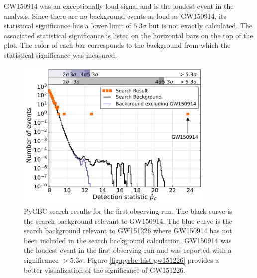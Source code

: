 GW150914 
was an exceptionally loud signal and is the loudest event in the 
analysis. Since there are no background events as loud as GW150914, 
its statistical significance has a lower limit of $5.3\sigma$ 
but is not exactly calculated. The associated statistical significance 
is listed on the horizontal bars on the top of the plot. The color 
of each bar corresponds to the background from which the statistical 
significance was measured.  

\begin{figure}[ht!]%
\includegraphics[width=0.85\textwidth]{figures/O1/pycbc_hist_GW150914}
\caption[PyCBC result histograms for GW150914]{PyCBC search results for %
         the first observing run. The black curve is the search background %
         relevant to GW150914. The blue curve is the search background %
         relevant to GW151226 where GW150914 has not been included in the %
         search background calculation. GW150914 was the loudest event in %
         the first observing run and was reported with a significance %
         $> 5.3\sigma$. Figure \ref{fig:pycbc-hist-gw151226} provides %
         a better visualization of the significance of GW151226.}
\label{fig:pycbc-hist-gw150914}
\end{figure}

